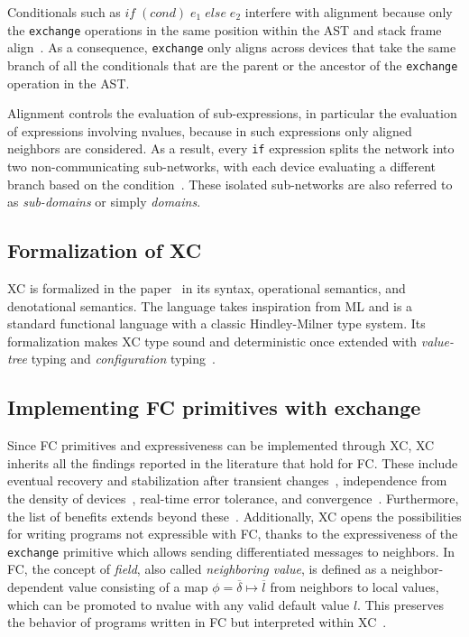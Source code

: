Conditionals such as $if\;(cond)\;{e_1}\;else\;{e_2}$ interfere with alignment because only the \texttt{exchange} operations in the same position within the \ac{AST} and stack frame align~\cite{xc}.
%
As a consequence, \texttt{exchange} only aligns across devices that take the same branch of all the conditionals that are the parent or the ancestor of the \texttt{exchange} operation in the \ac{AST}.

Alignment controls the evaluation of sub-expressions, in particular the evaluation of expressions involving nvalues, because in such expressions only aligned neighbors are considered.
%
As a result, every \texttt{if} expression splits the network into two non-communicating sub-networks, with each device evaluating a different branch based on the condition~\cite{xc}.
%
These isolated sub-networks are also referred to as \textit{sub-domains} or simply \textit{domains}.

\subsection{Formalization of XC}

\ac{XC} is formalized in the paper~\cite{xc} in its syntax, operational semantics, and denotational semantics.
%
The language takes inspiration from \ac{ML} and is a standard functional language with a classic Hindley-Milner type system.
%
Its formalization makes \ac{XC} type sound and deterministic once extended with \textit{value-tree} typing and \textit{configuration} typing~\cite{xc}.

\subsection{Implementing FC primitives with exchange}

Since \ac{FC} primitives and expressiveness can be implemented through \ac{XC}, \ac{XC} inherits all the findings reported in the literature that hold for \ac{FC}.
%
These include eventual recovery and stabilization after transient changes~\cite{self-stabilisation-in-fc}, independence from the density of devices~\cite{density-independence-in-fc}, real-time error tolerance, and convergence~\cite{real-time-error-tolerance-in-fc}.
%
Furthermore, the list of benefits extends beyond these~\cite{xc}.
%
Additionally, \ac{XC} opens the possibilities for writing programs not expressible with \ac{FC}, thanks to the expressiveness of the \texttt{exchange} primitive which allows sending differentiated messages to neighbors.
%
In \ac{FC}, the concept of \textit{field}, also called \textit{neighboring value}, is defined as a neighbor-dependent value consisting of a map $\phi = \overline{\delta} \mapsto \overline{l}$ from neighbors to local values, which can be promoted to nvalue with any valid default value $l$.
%
This preserves the behavior of programs written in \ac{FC} but interpreted within \ac{XC}~\cite{xc}.

